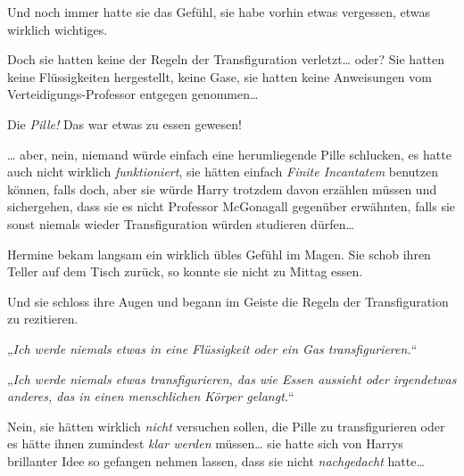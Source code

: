 Und noch immer hatte sie das Gefühl, sie habe vorhin etwas vergessen, etwas wirklich wichtiges.

Doch sie hatten keine der Regeln der Transfiguration verletzt… oder? Sie hatten keine Flüssigkeiten hergestellt, keine Gase, sie hatten keine Anweisungen vom Verteidigungs-Professor entgegen genommen…

Die \emph{Pille!} Das war etwas zu essen gewesen!

… aber, nein, niemand würde einfach eine herumliegende Pille schlucken, es hatte auch nicht wirklich \emph{funktioniert}, sie hätten einfach \emph{Finite Incantatem} benutzen können, falls doch, aber sie würde Harry trotzdem davon erzählen müssen und sichergehen, dass sie es nicht Professor McGonagall gegenüber erwähnten, falls sie sonst niemals wieder Transfiguration würden studieren dürfen…

Hermine bekam langsam ein wirklich übles Gefühl im Magen. Sie schob ihren Teller auf dem Tisch zurück, so konnte sie nicht zu Mittag essen.

Und sie schloss ihre Augen und begann im Geiste die Regeln der Transfiguration zu rezitieren.

„\emph{Ich werde niemals etwas in eine Flüssigkeit oder ein Gas transfigurieren.}“

„\emph{Ich werde niemals etwas transfigurieren, das wie Essen aussieht oder irgendetwas anderes, das in einen menschlichen Körper gelangt.}“

Nein, sie hätten wirklich \emph{nicht} versuchen sollen, die Pille zu transfigurieren oder es hätte ihnen zumindest \emph{klar werden} müssen… sie hatte sich von Harrys brillanter Idee so gefangen nehmen lassen, dass sie nicht \emph{nachgedacht} hatte…

